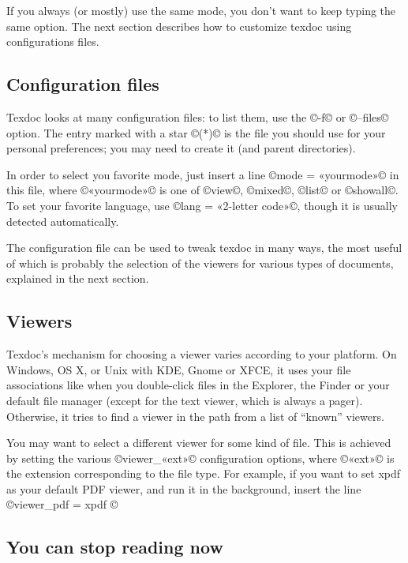 \documentclass[a4paper, oneside]{scrartcl}
\begin{document}
If you always (or mostly) use the same mode, you don't want to keep typing the
same option. The next section describes how to customize texdoc using
configurations files.

\subsection{Configuration files}\label{ss-quick-file}

Texdoc looks at many configuration files: to list them, use the ©-f© or
©--files© option. The entry marked with a star ©(*)© is the file you should
use for your personal preferences; you may need to create it (and parent
directories).

In order to select you favorite mode, just insert a line ©mode = «yourmode»©
in this file, where ©«yourmode»© is one of ©view©, ©mixed©, ©list© or
©showall©. To set your favorite language, use ©lang = «2-letter code»©, though
it is usually detected automatically.

The configuration file can be used to tweak texdoc in many ways, the most
useful of which is probably the selection of the viewers for various types of
documents, explained in the next section.

\subsection{Viewers}\label{ss-viewer}

Texdoc's mechanism for choosing a viewer varies according to your platform.
On Windows, OS X, or Unix with KDE, Gnome or XFCE, it uses your file
associations like when you double-click files in the Explorer, the Finder or
your default file manager (except for the text viewer, which is always a
pager). Otherwise, it tries to find a viewer in the path from a list of
``known'' viewers.

You may want to select a different viewer for some kind of file. This is
achieved by setting the various ©viewer_«ext»© configuration options, where
©«ext»© is the extension corresponding to the file type. For example, if you
want to set xpdf as your default PDF viewer, and run it in the background,
insert the line ©viewer_pdf = xpdf %
©%

\subsection{You can stop reading now}
\end{document}
